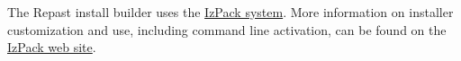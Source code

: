 \documentclass[11pt]{amsart}
\begin{document}
The Repast install builder uses the \href{http://izpack.org/}{IzPack system}.  More information on installer customization and use, including command line activation, can be found on the  \href{http://izpack.org/}{IzPack web site}.

\noindent\begin{minipage}[h]{\textwidth}
\vspace{.2in}
\lstset{language=java,caption=}
\begin{lstlisting}

\end{lstlisting}
\vspace{.2in}
\end{minipage}
\end{document}
